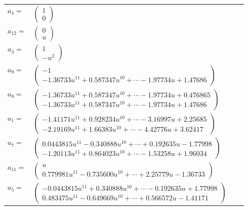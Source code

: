 \documentclass[1p]{elsarticle_modified}
\theoremstyle{definition}
\begin{document}
\begin{tabular}{m{7pt} m{180pt} m{7pt} m{180pt} }
\flushright $a_{4}=$&$\begin{pmatrix}1\\0\end{pmatrix}$ \\
\flushright $a_{12}=$&$\begin{pmatrix}0\\u\end{pmatrix}$ \\
\flushright $a_{3}=$&$\begin{pmatrix}1\\- u^2\end{pmatrix}$ \\
\flushright $a_{9}=$&$\begin{pmatrix}-1\\-1.36733 u^{11}+0.587347 u^{10}+\cdots-1.97734 u+1.47686\end{pmatrix}$ \\
\flushright $a_{8}=$&$\begin{pmatrix}-1.36733 u^{11}+0.587347 u^{10}+\cdots-1.97734 u+0.476865\\-1.36733 u^{11}+0.587347 u^{10}+\cdots-1.97734 u+1.47686\end{pmatrix}$ \\
\flushright $a_{1}=$&$\begin{pmatrix}-1.41171 u^{11}+0.928234 u^{10}+\cdots-3.16997 u+2.25685\\-2.19169 u^{11}+1.66383 u^{10}+\cdots-4.42776 u+3.62417\end{pmatrix}$ \\
\flushright $a_{7}=$&$\begin{pmatrix}0.0443815 u^{11}-0.340888 u^{10}+\cdots+0.192635 u-1.77998\\-1.20113 u^{11}+0.864023 u^{10}+\cdots-1.53258 u+1.96034\end{pmatrix}$ \\
\flushright $a_{11}=$&$\begin{pmatrix}u\\0.779981 u^{11}-0.735600 u^{10}+\cdots+2.25779 u-1.36733\end{pmatrix}$ \\
\flushright $a_{5}=$&$\begin{pmatrix}-0.0443815 u^{11}+0.340888 u^{10}+\cdots-0.192635 u+1.77998\\0.483475 u^{11}-0.649669 u^{10}+\cdots+0.566572 u-1.41171\end{pmatrix}$ \\

\end{tabular}
\end{document}
